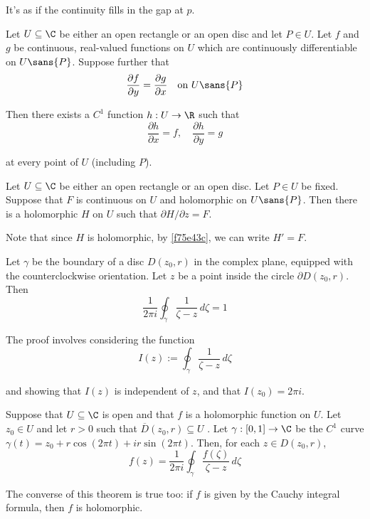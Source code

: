 It's as if the continuity fills in the gap at $p$.

\Theorem{}\label{f017dd0}

Let $U\subseteq\C$ be either an open rectangle or an open disc and let $P\in
U$. Let $f$ and $g$ be continuous, real-valued functions on $U$ which are
continuously differentiable on $U\sans{P}$. Suppose further that
$$
  \frac{\partial f}{\partial y}=\frac{\partial g}{\partial x}
  \quad\text{on }U\sans{P}
$$

Then there exists a $C^1$ function $h:U\to\R$ such that
$$
  \frac{\partial h}{\partial x}=f,\quad
  \frac{\partial h}{\partial y}=g
$$

at every point of $U$ (including $P$).

\label{b2d9d89}

Let $U\subseteq\C$ be either an open rectangle or an open disc. Let $P\in U$ be
fixed. Suppose that $F$ is continuous on $U$ and holomorphic on $U\sans{P}$.
Then there is a holomorphic $H$ on $U$ such that $\partial H/\partial z=F$.

Note that since $H$ is holomorphic, by \autoref{f75e43c}, we can write $H'=F$.

\Lemma{}\label{c6c594a}

Let $\gamma$ be the boundary of a disc $D(z_0,r)$ in the complex plane,
equipped with the counterclockwise orientation. Let $z$ be a point inside the
circle $\partial D(z_0,r)$. Then
$$
  \frac1{2\pi i}\oint_\gamma\frac1{\zeta-z}\,d\zeta=1
$$

The proof involves considering the function
$$
  I(z):=\oint_\gamma\frac1{\zeta-z}\,d\zeta
$$

and showing that $I(z)$ is independent of $z$, and that $I(z_0)=2\pi i$.

\label{e50677f}

Suppose that $U\subseteq\C$ is open and that $f$ is a holomorphic function on
$U$. Let $z_0\in U$ and let $r>0$ such that $\overline D(z_0,r)\subseteq U$ .
Let $\gamma:[0,1]\to\C$ be the $C^1$ curve $\gamma(t)=z_0+r\cos(2\pi
t)+ir\sin(2\pi t)$. Then, for each $z\in D(z_0,r)$,
$$
  f(z)=\frac1{2\pi i}\oint_\gamma\frac{f(\zeta)}{\zeta-z}\,d\zeta
$$

The converse of this theorem is true too: if $f$ is given by the Cauchy
integral formula, then $f$ is holomorphic.

\label{da0d68d}

